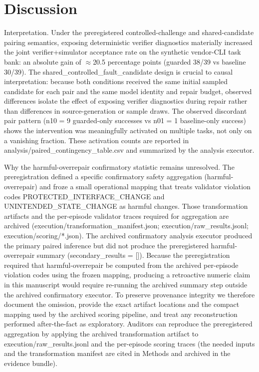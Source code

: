 \documentclass[conference]{IEEEtran}
\begin{document}
\section{Discussion}
Interpretation. Under the preregistered controlled-challenge and shared-candidate pairing semantics, exposing deterministic verifier diagnostics materially increased the joint verifier+simulator acceptance rate on the synthetic vendor-CLI task bank: an absolute gain of \ensuremath{\approx}20.5 percentage points (guarded 38/39 vs baseline 30/39). The shared\_controlled\_fault\_candidate design is crucial to causal interpretation: because both conditions received the same initial sampled candidate for each pair and the same model identity and repair budget, observed differences isolate the effect of exposing verifier diagnostics during repair rather than differences in source-generation or sample draws. The observed discordant pair pattern (n10 = 9 guarded-only successes vs n01 = 1 baseline-only success) shows the intervention was meaningfully activated on multiple tasks, not only on a vanishing fraction. These activation counts are reported in analysis/paired\_contingency\_table.csv and summarized by the analysis executor.

Why the harmful-overrepair confirmatory statistic remains unresolved. The preregistration defined a specific confirmatory safety aggregation (harmful-overrepair) and froze a small operational mapping that treats validator violation codes PROTECTED\_INTERFACE\_CHANGE and UNINTENDED\_STATE\_CHANGE as harmful changes. Those transformation artifacts and the per-episode validator traces required for aggregation are archived (execution/transformation\_manifest.json; execution/raw\_results.jsonl; execution/scoring/*.json). The archived confirmatory analysis executor produced the primary paired inference but did not produce the preregistered harmful-overrepair summary (secondary\_results = []). Because the preregistration required that harmful-overrepair be computed from the archived per-episode violation codes using the frozen mapping, producing a retroactive numeric claim in this manuscript would require re-running the archived summary step outside the archived confirmatory executor. To preserve provenance integrity we therefore document the omission, provide the exact artifact locations and the compact mapping used by the archived scoring pipeline, and treat any reconstruction performed after-the-fact as exploratory. Auditors can reproduce the preregistered aggregation by applying the archived transformation artifact to execution/raw\_results.jsonl and the per-episode scoring traces (the needed inputs and the transformation manifest are cited in Methods and archived in the evidence bundle).
\end{document}
